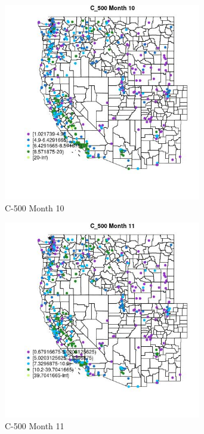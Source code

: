 \begin{figure} 
\centering  
\includegraphics[width=0.77\textwidth]{Code_Outputs/ML_input_report_ML_input_PM25_Step5_part_d_de_duplicated_aves_ML_input_MapObsMo10C_500.jpg} 
\caption{\label{fig:ML_input_report_ML_input_PM25_Step5_part_d_de_duplicated_aves_ML_inputMapObsMo10C_500}C-500 Month 10} 
\end{figure} 
 

\begin{figure} 
\centering  
\includegraphics[width=0.77\textwidth]{Code_Outputs/ML_input_report_ML_input_PM25_Step5_part_d_de_duplicated_aves_ML_input_MapObsMo11C_500.jpg} 
\caption{\label{fig:ML_input_report_ML_input_PM25_Step5_part_d_de_duplicated_aves_ML_inputMapObsMo11C_500}C-500 Month 11} 
\end{figure} 
 

